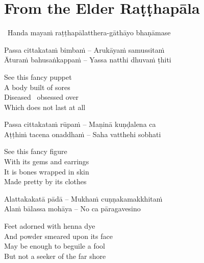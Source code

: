 \suttaRef{[SN 22.22]}


\section{From the Elder Raṭṭhapāla}
\label{ratthapala}

\begin{leader}
  \anglebracketleft\ \hspace{-0.5mm}Handa mayaṁ raṭṭhapālatthera-gāthāyo bhaṇāmase \hspace{-0.5mm}\anglebracketright\
\end{leader}

\begin{verses}
  Passa cittakataṁ bimbaṁ – Arukāyaṁ samussitaṁ\\
  Āturaṁ bahusaṅkappaṁ – Yassa natthi dhuvaṁ ṭhiti
\end{verses}

\begin{english-verses}
  See this fancy puppet\\
  A body built of sores\\
  Diseased \breathmark\ obsessed over\\
  Which does not last at all
\end{english-verses}

\begin{verses}
  Passa cittakataṁ rūpaṁ – Maṇinā kuṇḍalena ca\\
  Aṭṭhiṁ tacena onaddhaṁ – Saha vatthehi sobhati
\end{verses}

\begin{english-verses}
  See this fancy figure\\
  With its gems and earrings\\
  It is bones wrapped in skin\\
  Made pretty by its clothes
\end{english-verses}

\begin{verses}
  Alattakakatā pādā – Mukhaṁ cuṇṇakamakkhitaṁ\\
  Alaṁ bālassa mohāya – No ca pāragavesino
\end{verses}

\begin{english-verses}
  Feet adorned with henna dye\\
  And powder smeared upon its face\\
  May be enough to beguile a fool\\
  But not a seeker of the far shore
\end{english-verses}

